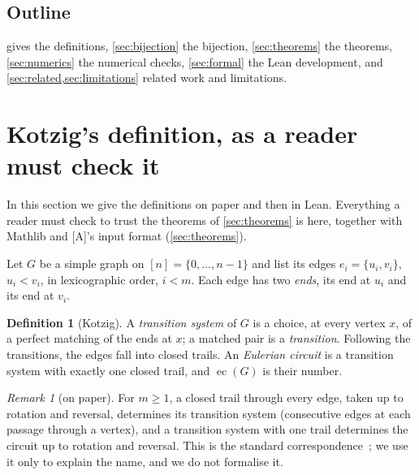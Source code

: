 \documentclass[10pt]{amsart}
\theoremstyle{plain}
\theoremstyle{definition}
\newtheorem{definition}[theorem]{Definition}
\theoremstyle{remark}
\newtheorem{remark}[theorem]{Remark}
\numberwithin{equation}{section}
\newcommand{\A}{\textup{[A]}}
\newcommand{\EC}{\operatorname{ec}}
\begin{document}
\subsection*{Outline}
 gives the definitions, \cref{sec:bijection} the bijection, \cref{sec:theorems} the
theorems, \cref{sec:numerics} the numerical checks, \cref{sec:formal} the Lean development, and
\cref{sec:related,sec:limitations} related work and limitations.

\section{Kotzig's definition, as a reader must check it}\label{sec:defs}

In this section we give the definitions on paper and then in Lean. Everything a reader must check to
trust the theorems of \cref{sec:theorems} is here, together with Mathlib and \A's input format
(\cref{sec:theorems}).

Let $G$ be a simple graph on $[n]=\{0,\dots,n-1\}$ and list its edges $e_i=\{u_i,v_i\}$, $u_i<v_i$,
in lexicographic order, $i<m$. Each edge has two \emph{ends}, its end at $u_i$ and its end at $v_i$.

\begin{definition}[Kotzig]\label{def:kotzig}
A \emph{transition system} of $G$ is a choice, at every vertex $x$, of a perfect matching of the ends
at $x$; a matched pair is a \emph{transition}. Following the transitions, the edges fall into closed
trails. An \emph{Eulerian circuit} is a transition system with exactly one closed trail, and $\EC(G)$
is their number.
\end{definition}

\begin{remark}[on paper]\label{rem:kotzig}
For $m\ge1$, a closed trail through every edge, taken up to rotation and reversal, determines its
transition system (consecutive edges at each passage through a vertex), and a transition system with
one trail determines the circuit up to rotation and reversal. This is the standard
correspondence~\cite{Kot68}; we use it only to explain the name, and we do not formalise it.
\end{remark}
\end{document}
